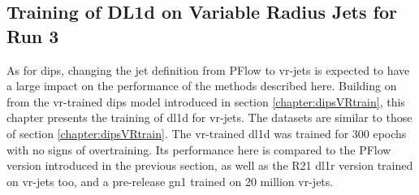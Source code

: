 \subsection{Training of DL1d on Variable Radius Jets for Run 3}\label{sec:VRdl1dTrain}
As for \gls{dips}, changing the jet definition from PFlow to \gls{vr}-jets is expected to have a large impact on the performance of the methods described here. Building on from the \gls{vr}-trained \gls{dips} model introduced in section \ref{chapter:dipsVRtrain}, this chapter presents the training of \gls{dl1d} for \gls{vr}-jets. The datasets are similar to those of section \ref{chapter:dipsVRtrain}. The \gls{vr}-trained \gls{dl1d} was trained for 300 epochs with no signs of overtraining. Its performance here is compared to the PFlow version introduced in the previous section, as well as the R21 \gls{dl1r} version trained on \gls{vr}-jets too, and a pre-release \gls{gn1} trained on 20 million \gls{vr}-jets.

